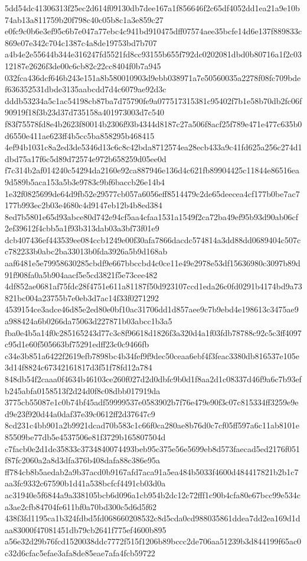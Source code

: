 \documentclass[11pt,a4paper]{article}
\begin{document}
{5dd54dc41306313f25ec2d614f09130db7dee167a1f856646f2c65df4052dd1ea21a9e10b74ab13a811759b20f798c40c05b8c1a3e859c27
e0fc9c0b6e3ef95c6b7e047a77ebc4c941bd910475dff07574aee35bcfe14d6e137f889833c869e07e342c704c1387c4a8de19753bd7b707
a4b4e2e55644b344e316247fd5521fd8cc93155b655f792dc0202081dbd0b80716a1f2c0312187e2626f3de00c6cb82c22cc8404f0b7a945
032fca436dcf646b243e151a8b580010903d9ebb038971a7e50560035a2278f08fc709bdef636352531dbde3135aabcdd7d4c6079ae92d3c
dddb53234a5c1ac54198cb87ba7d75790fe9a077517315381c95402f7b1e58b70db2fc06f90919f18f3b23d37d735158a401973003d7c540
f83f75578fd8e4b2623f80014b2306f93b4344d8187c27a506f8acf25f789e471e477c635b0d6550e411ae623ff4b5cc5ba858295b468415
4ef94b1031c8a2ed3de5346d13c6c8c42bda8712574ea28ecb433a9c41fd625a256c274d1dbd75a17f6c5d89d72574e972b658259d05ee0d
f7c314b2af014240c54294da2160e92ca887946e136d4c621fb89904425c11844e86516ea9d589b5aca153a5b3e9783c9bf6baccb26e14b4
1e32f0825699de64d9fb52e29577cb057a6056eff8514479c2de65deecea4cf177b0be7ac7177b993ec2b03e4680c4d9147eb12b4b8ed384
8ed7b5801e65d93abce80d742e94cf5aa4cfaa1531a1549f2ca72ba49ef95b93d90ab06cf2ef39612f4cbb5a1f93b313dab03a3bf73f01e9
dcb407436ef443539ee084ccb1249e00f30afa7866dacdc574814a3dd88dd0689404c507cc782233b0abc2ba33013b0fda3926a5b9d168ab
aaf6481e5e79958630285cbdf9e667bbccbd4c0ce11e49e2978e53df15636980c3097b89d91f908fa0a5b904aacf5e5cd3821f5e73cee482
4df852ae0681af75fdc28f4751e611a81187f50d923107ccd1eda26c0fd0291b4174bd9a73821bc004a23755b7e0eb3d7ac14f33f0271292
4539154ce3adce46d85e2ed80e0bf10ac31706dd1d857aee9c7b9ebd4e198613c3475ae9a988424a6b0266da75063d227871b03abcc1b3a5
fba0e4b5a14f0c285165243d77c3c8f96618d1826f3a320d4a1f03fdb78788c92c5c3ff4097c95d1e60f505663bf75291edff23c0c9466fb
c34e3b851a6422f2619efb7898bc4b34fef9f9dec50ceaa6ebf4f3feac3380db816537e105e3d14f8824c67342161817d3f51f78fd12a784
848db54f2caaa0f4634b46103ce260f027d2d0dbfc9b0d1f8aa2d1c08337d46f9a6c7b93efb245abfa0158513f2d24d0f8c08dbb017919da
3775cb55087e1c0b74bf45adf59999537e0583902b7f76e479e90f3c07c815334ff3259e9ed9e23f920d44a0daf37e39c0612ff2d37647c9
8cd231c4bb901a2b9921dcad70b583c1c66f0ca280ae8b76d0c7cf05ff597a6c11ab8101e85509be77db5e4537506e81f3729b165807504d
c7facb0e2d1de35833c3734840074493beb95c375e56e5699eb8d573faecad5ed2176f051f87fc2060a2a8d3dfa376b408dafa88c386e95a
ff784cb8b5aedab2a9b37acd0b9167afd7aca91a5ea484b5033f4600d484417821b2b1c7aa3fc9332c67590b1d41a538bcfcf4491cb03d0a
ac31940e5f6844a9a338105bcb6d096a1cb954b2dc12c72fff1c90b4cfa80e67bcc99e534ca3ae2cfb84704fe611bf0a70bd300c5d6d5f62
438f3fd1195ca1b324fdbd5fd068660208532c8d5cda0cd988035861ddea7dd2ea169d1daa83000f47081451db79cb2641f775ef4600b895
a56e32d29b76fcd1520038ddc7772f515f1206b89bccc2de706aa51239b3d844199f65ac0c32d6cfac5efae3afa8de85eae7afa4fcb59722
}
\end{document}
